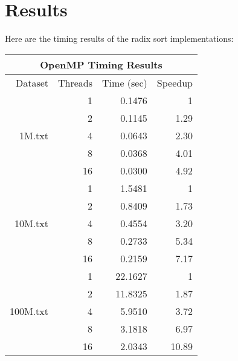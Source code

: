 \documentclass[a4paper]{article}
\begin{document}
\pagebreak

\section{Results}

Here are the timing results of the radix sort implementations:

\begin{center}
  \begin{tabular}{| r | r r r |}
    \hline
    \multicolumn{4}{|c|}{OpenMP Timing Results} \\
    \hline
    Dataset & Threads & Time (sec) & Speedup \\
    \hline
    \multirow{5}{4em}{1M.txt} & 1 & 0.1476 & 1 \\
    & 2 & 0.1145 & 1.29 \\
    & 4 & 0.0643 & 2.30 \\
    & 8 & 0.0368 & 4.01 \\
    & 16 & 0.0300 & 4.92 \\
    \hline
    \multirow{5}{4em}{10M.txt} & 1 & 1.5481 & 1 \\
    & 2 & 0.8409 & 1.73 \\
    & 4 & 0.4554 & 3.20 \\
    & 8 & 0.2733 & 5.34 \\
    & 16 & 0.2159 &  7.17 \\
    \hline
    \multirow{5}{4em}{100M.txt} & 1 & 22.1627 & 1 \\
    & 2 & 11.8325 & 1.87 \\
    & 4 & 5.9510 & 3.72 \\
    & 8 & 3.1818 & 6.97 \\
    & 16 & 2.0343 & 10.89 \\
    \hline
  \end{tabular}
\end{center}
\end{document}
